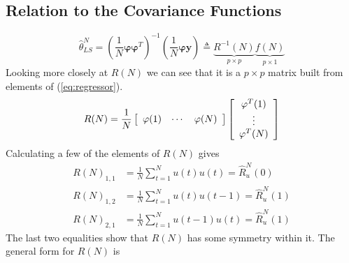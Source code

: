 \documentclass[lecture,12pt,]{pcms-l}
\theoremstyle{example}
\newcommand{\thn}{\hat{\theta}_{LS}^N}
\begin{document}
\subsection{Relation to the Covariance Functions}
$$\thn = (\frac{1}{N}\mathbf{\varphi\varphi}^T)^{-1}(\frac{1}{N}\mathbf{\varphi y}) \triangleq \underbrace{R^{-1}(N)}_{p\times p} \underbrace{f(N)}_{p\times 1}$$
Looking more closely at $R(N)$ we can see that it is a $p\times p$ matrix built from elements of (\ref{eq:regressor}).
$$R(N) = \frac{1}{N}\left[\begin{array}{c c c} \varphi(1) & \cdots & \varphi(N) \end{array}\right]
\left[\begin{array}{c} \varphi^T(1) \\ \vdots \\ \varphi^T(N) \end{array}\right]$$
Calculating a few of the elements of $R(N)$ gives
\begin{align*}
R(N)_{1,1} &= \frac{1}{N}\sum_{t=1}^Nu(t)u(t) = \hat{R}_u^N(0) \\
R(N)_{1,2} &= \frac{1}{N}\sum_{t=1}^Nu(t)u(t-1) = \hat{R}_u^N(1) \\
R(N)_{2,1} &= \frac{1}{N}\sum_{t=1}^Nu(t-1)u(t) = \hat{R}_u^N(1)
\end{align*}
The last two equalities show that $R(N)$ has some symmetry within it. The general form for $R(N)$ is
\end{document}
